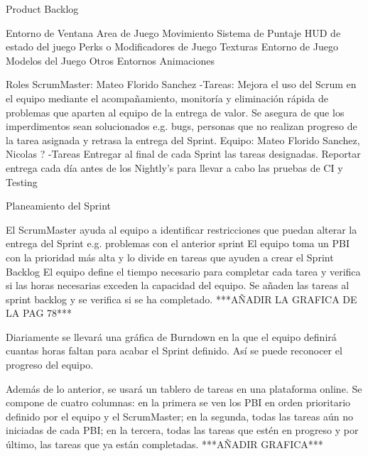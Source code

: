 Product Backlog

Entorno de Ventana
Area de Juego
Movimiento
Sistema de Puntaje
HUD de estado del juego
Perks o Modificadores de Juego
Texturas
Entorno de Juego
Modelos del Juego
Otros Entornos
Animaciones

Roles
ScrumMaster: Mateo Florido Sanchez
-Tareas: Mejora el uso del Scrum en el equipo mediante el acompañamiento, monitoría y eliminación rápida de problemas que aparten al equipo de la entrega de valor.
Se asegura de que los imperdimentos sean solucionados e.g. bugs, personas que no realizan progreso de la tarea asignada y retrasa la entrega del Sprint.
Equipo: Mateo Florido Sanchez, Nicolas ?
-Tareas Entregar al final de cada Sprint las tareas designadas. 
Reportar entrega cada día antes de los Nightly's para llevar a cabo las pruebas de CI y Testing

Planeamiento del Sprint

El ScrumMaster ayuda al equipo a identificar restricciones que puedan alterar la entrega del Sprint e.g. problemas con el anterior sprint
El equipo toma un PBI con la prioridad más alta y lo divide en tareas que ayuden a crear el Sprint Backlog
El equipo define el tiempo necesario para completar cada tarea y verifica si las horas necesarias exceden la capacidad del equipo.
Se añaden las tareas al sprint backlog y se verifica si se ha completado.
***AÑADIR LA GRAFICA DE LA PAG 78***

Diariamente se llevará una gráfica de Burndown en la que el equipo definirá cuantas horas faltan para acabar el Sprint definido. Así se puede reconocer el progreso del equipo.

Además de lo anterior, se usará un tablero de tareas en una plataforma online. Se compone de cuatro columnas: en la primera se ven los PBI en orden prioritario definido por el equipo y el ScrumMaster; en la segunda, todas las tareas aún no iniciadas de cada PBI; en la tercera, todas las tareas que estén en progreso y por último, las tareas que ya están completadas.
***AÑADIR GRAFICA***



